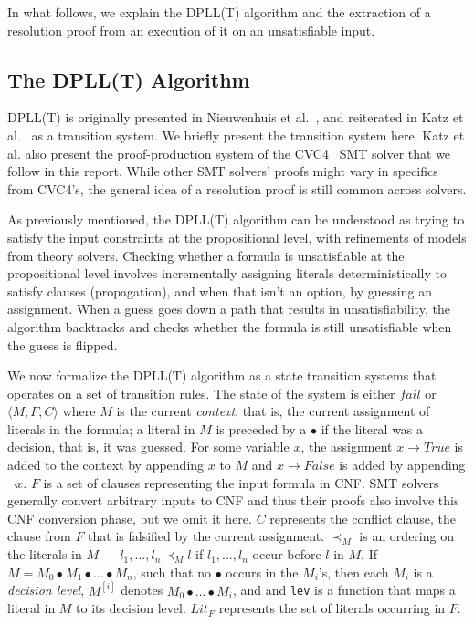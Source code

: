 \documentclass{article}
\begin{document}
	In what follows, we explain the 
	DPLL(T) algorithm and the 
	extraction of a resolution proof
	from an execution of it on an 
	unsatisfiable input.
	
	\subsection{The DPLL(T) Algorithm}
	\label{sec:dpllt}
	
	DPLL(T) is originally presented 
	in Nieuwenhuis et 
	al.~\cite{DBLP:journals/jacm/NieuwenhuisOT06}, 
	and reiterated in Katz et 
	al.~\cite{DBLP:conf/fmcad/KatzBTRH16} 
	as a transition system. We briefly present 
	the transition system here. Katz et al. also 
	present the proof-production system of the 
	CVC4~\cite{DBLP:conf/cav/BarrettCDHJKRT11} 
	SMT solver that we follow 
	in this report. While other SMT solvers'
	proofs might vary in specifics from 
	CVC4's, the general idea of a 
	resolution proof is still common 
	across solvers.
	
	As previously mentioned, the DPLL(T)
	algorithm can be understood as 
	trying to satisfy the input constraints
	at the propositional level, with 
	refinements of models from 
	theory solvers. Checking whether a
	formula is unsatisfiable at the 
	propositional level involves 
	incrementally assigning literals
	deterministically to satisfy clauses
	(propagation), and when that isn't an 
	option, by guessing an 
	assignment. When a guess goes 
	down a path that results in 
	unsatisfiability, the algorithm 
	backtracks and checks whether the 
	formula is still unsatisfiable 
	when the guess is flipped.
	
	We now formalize the DPLL(T) algorithm 
	as a state transition systems that 
	operates on a set of transition rules. 
	The state of the system is either 
	$fail$ or $\langle M, F, C \rangle$ 
	where $M$ is the current 
	\textit{context}, that is, 
	the current assignment of literals in 
	the formula; a literal in $M$ is 
	preceded by a $\bullet$ if the literal 
	was a decision, that is, it was 
	guessed. For some variable $x$, 
	the assignment $x \to True$ is added 
	to the context by appending $x$ to 
	$M$ and $x \to False$ is added by 
	appending $\neg x$. $F$ is a set of 
	clauses representing the input formula 
	in CNF. SMT solvers generally convert 
	arbitrary inputs to CNF and thus 
	their proofs also involve this CNF
	conversion phase, but we omit it here.
	$C$ represents the conflict 
	clause, the clause from $F$ that is 
	falsified by the current assignment. 
	$\prec_M$ is an ordering 
	on the literals in $M$ ---
	$l_1, ..., l_n \prec_M l$ if 
	$l_1, ..., l_n$ occur before 
	$l$ in $M$. If $M = M_0 
	\bullet M_1 \bullet ... \bullet M_n$, 
	such that no $\bullet$ occurs in 
	the $M_i$'s, then each $M_i$ is a
	\textit{decision level}, $M^{[i]}$ 
	denotes $M_0 \bullet ... \bullet M_i$,
	and and \texttt{lev} is a function 
	that maps a literal in $M$ to its 
	decision level. $Lit_F$ represents the 
	set of literals occurring in $F$.
	
\end{document}
